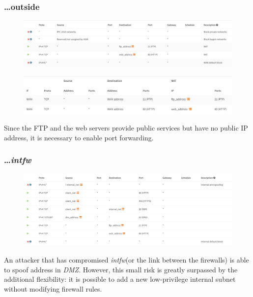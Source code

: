 \documentclass{homework}
\newcommand{\dmz}{\textit{DMZ}\xspace}
\newcommand{\intfw}{\textit{intfw}\xspace}
\begin{document}
    \subsubsection{\dots outside}
    \begin{figure}[H]
        \centering
        \includegraphics[width=\linewidth]{images/mainfw-wan}
        \label{fig:mainfw-wan}
    \end{figure}
    
    \begin{figure}[H]
        \centering
        \includegraphics[width=\linewidth]{images/mainfw-portforwarding}
        \label{fig:mainfw-portforwarding}
    \end{figure}
    Since the FTP and the web servers provide public services but have no public IP address, it is necessary to enable port forwarding.
    
    \subsubsection{\dots \intfw}
    \begin{figure}[H]
        \centering
        \includegraphics[width=\linewidth]{images/mainfw-internal}
        \label{fig:mainfw-internal}
    \end{figure}
    An attacker that has compromised \intfw (or the link between the firewalls) is able to spoof address in \dmz.
    However, this small risk is greatly surpassed by the additional flexibility: it is possible to add a new low-privilege internal subnet without modifying firewall rules.
    
\end{document}
